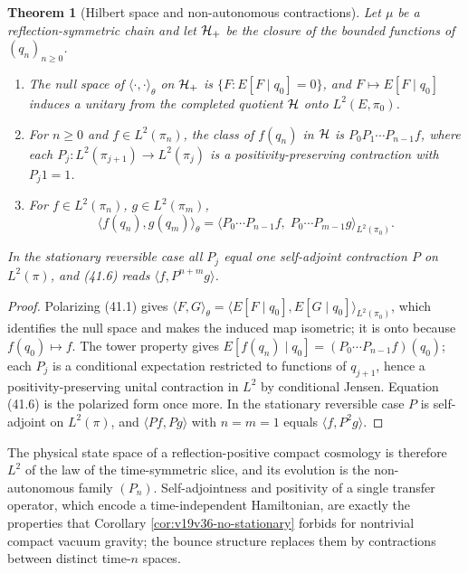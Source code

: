 \documentclass[11pt]{article}
\newtheorem{theorem}{Theorem}[section]
\theoremstyle{remark}
\begin{document}
\begin{theorem}[Hilbert space and non-autonomous contractions]
\label{thm:v19v38-reconstruction}
Let \(\mu\) be a reflection-symmetric chain and let \({\cal H}_+\) be the
closure of the bounded functions of \((q_n)_{n\geq0}\).
\begin{enumerate}
\item The null space of \(\langle\cdot,\cdot\rangle_\theta\) on
      \({\cal H}_+\) is \(\{F:E[F\mid q_0]=0\}\), and
      \(F\mapsto E[F\mid q_0]\) induces a unitary from the completed
      quotient \({\cal H}\) onto \(L^2(E,\pi_0)\).
\item For \(n\geq0\) and \(f\in L^2(\pi_n)\), the class of \(f(q_n)\) in
      \({\cal H}\) is \(P_0P_1\cdots P_{n-1}f\), where each
      \(P_j:L^2(\pi_{j+1})\to L^2(\pi_j)\) is a positivity-preserving
      contraction with \(P_j1=1\).
\item For \(f\in L^2(\pi_n)\), \(g\in L^2(\pi_m)\),
\[
 \langle f(q_n),g(q_m)\rangle_\theta
 =\bigl\langle P_0\cdots P_{n-1}f,\;P_0\cdots P_{m-1}g\bigr\rangle_{L^2(\pi_0)}.
                                                                    \tag{41.6}
\]
\end{enumerate}
In the stationary reversible case all \(P_j\) equal one self-adjoint
contraction \(P\) on \(L^2(\pi)\), and (41.6) reads
\(\langle f,P^{n+m}g\rangle\).
\end{theorem}

\begin{proof}
Polarizing (41.1) gives
\(\langle F,G\rangle_\theta=\langle E[F\mid q_0],E[G\mid q_0]\rangle_{L^2(\pi_0)}\),
which identifies the null space and makes the induced map isometric;
it is onto because \(f(q_0)\mapsto f\).  The tower property gives
\(E[f(q_n)\mid q_0]=(P_0\cdots P_{n-1}f)(q_0)\); each \(P_j\) is a
conditional expectation restricted to functions of \(q_{j+1}\), hence a
positivity-preserving unital contraction in \(L^2\) by conditional
Jensen.  Equation (41.6) is the polarized form once more.  In the
stationary reversible case \(P\) is self-adjoint on \(L^2(\pi)\), and
\(\langle Pf,Pg\rangle\) with \(n=m=1\) equals \(\langle f,P^2g\rangle\).
\end{proof}

The physical state space of a reflection-positive compact cosmology is
therefore \(L^2\) of the law of the time-symmetric slice, and its
evolution is the non-autonomous family \((P_n)\).  Self-adjointness and
positivity of a single transfer operator, which encode a
time-independent Hamiltonian, are exactly the properties that
Corollary \ref{cor:v19v36-no-stationary} forbids for nontrivial compact
vacuum gravity; the bounce structure replaces them by contractions
between distinct time-\(n\) spaces.
\end{document}
